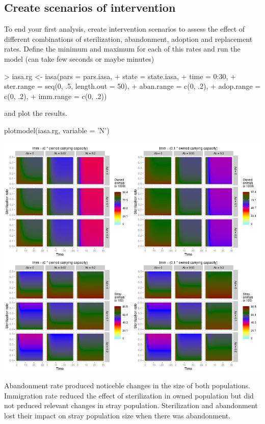 \documentclass[a4paper]{article}
\begin{document}
\subsection{Create scenarios of intervention}
To end your first analysis, create intervention scenarios to assess the effect of different combinations of sterilization, abandonment, adoption and replacement rates. Define the minimum and maximum for each of this rates and run the model (can take few seconds or maybe minutes)

\begin{Schunk}
\begin{Sinput}
> iasa.rg <- iasa(pars = pars.iasa,
+                 state = state.iasa,
+                 time = 0:30,
+                 ster.range = seq(0, .5, length.out = 50),
+                 aban.range = c(0, .2),
+                 adop.range = c(0, .2),
+                 imm.range = c(0, .2))
\end{Sinput}
\end{Schunk}

and plot the results.

plotmodel(iasa.rg, variable = 'N')

\begin{center}
\includegraphics[scale=.9]{iasa_plot.png}
\end{center}


Abandonment rate produced noticeble changes in the size of both populations. Immigration rate reduced the effect of sterilization in owned population but did not prduced relevant changes in stray population. Sterilization and abandonment lost their impact on stray population size when there was abandonment.
\end{document}
